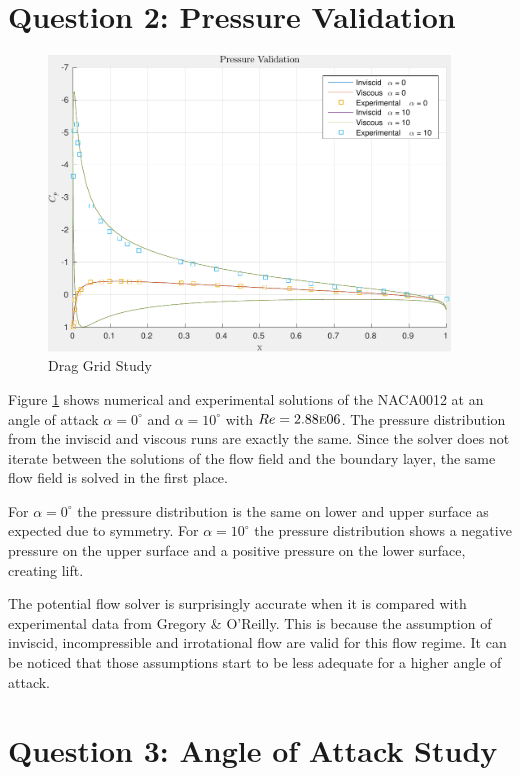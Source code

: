 \documentclass[letterpaper,12pt,]{article}
\begin{document}
\section*{Question 2: Pressure Validation}

\begin{figure}[!h]
    \centering
    \includegraphics[width = 0.95\textwidth]{./figures/q2pressure.pdf}
    \caption{Drag Grid Study}
    \label{fig:q2}
\end{figure}

Figure \ref{fig:q2} shows numerical and experimental solutions of the NACA0012 at an angle of attack $\alpha = 0^\circ$ and $\alpha = 10^\circ$ with $Re = 2.88\textsc{e}06$.
The pressure distribution from the inviscid and viscous runs are exactly the same. Since the solver does not iterate between the solutions of the flow field and the boundary layer, the same flow field is solved in the first place.

For $\alpha = 0^\circ$ the pressure distribution is the same on lower and upper surface as expected due to symmetry. For $\alpha = 10^\circ$ the pressure distribution shows a negative pressure on the upper surface and a positive pressure on the lower surface, creating lift.

The potential flow solver is surprisingly accurate when it is compared with experimental data from Gregory \& O'Reilly.
This is because the assumption of inviscid, incompressible and irrotational flow are valid for this flow regime.
It can be noticed that those assumptions start to be less adequate for a higher angle of attack.

\section*{Question 3: Angle of Attack Study}
\end{document}
